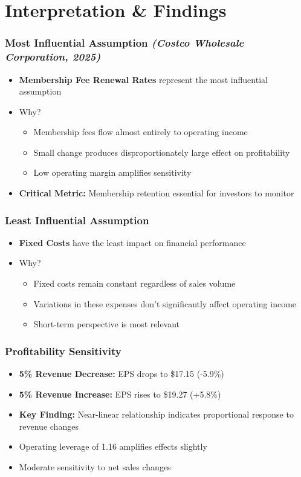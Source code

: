\documentclass[11pt]{beamer}
\begin{document}
\section{Interpretation \& Findings}
\begin{frame}
\frametitle{Most Influential Assumption \textit{(Costco Wholesale Corporation, 2025)}}
\begin{itemize}
  \item \textbf{Membership Fee Renewal Rates} represent the most influential assumption
  \item Why?
    \begin{itemize}
      \item Membership fees flow almost entirely to operating income
      \item Small change produces disproportionately large effect on profitability
      \item Low operating margin amplifies sensitivity
    \end{itemize}
  \item \textbf{Critical Metric:} Membership retention essential for investors to monitor
\end{itemize}
\end{frame}

\begin{frame}
\frametitle{Least Influential Assumption}
\begin{itemize}
  \item \textbf{Fixed Costs} have the least impact on financial performance
  \item Why?
    \begin{itemize}
      \item Fixed costs remain constant regardless of sales volume
      \item Variations in these expenses don't significantly affect operating income
      \item Short-term perspective is most relevant
    \end{itemize}
\end{itemize}
\end{frame}

\begin{frame}
\frametitle{Profitability Sensitivity}
\begin{itemize}
  \item \textbf{5\% Revenue Decrease:} EPS drops to \$17.15 (-5.9\%)
  \item \textbf{5\% Revenue Increase:} EPS rises to \$19.27 (+5.8\%)
  \item \textbf{Key Finding:} Near-linear relationship indicates proportional response to revenue changes
  \item Operating leverage of 1.16 amplifies effects slightly
  \item Moderate sensitivity to net sales changes
\end{itemize}
\end{frame}
\end{document}
